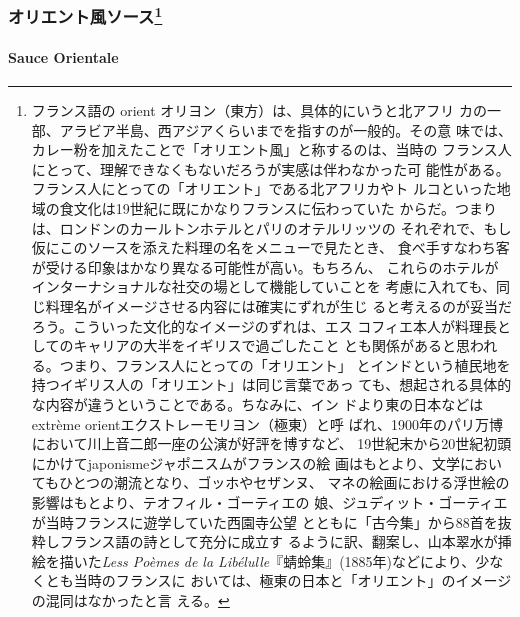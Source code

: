 \begin{recette}
{\subsubsection[オリエント風ソース]{\texorpdfstring{オリエント風ソース\footnote{フランス語の
  orient オリヨン（東方）は、具体的にいうと北アフリ
  カの一部、アラビア半島、西アジアくらいまでを指すのが一般的。その意
  味では、カレー粉を加えたことで「オリエント風」と称するのは、当時の
  フランス人にとって、理解できなくもないだろうが実感は伴わなかった可
  能性がある。フランス人にとっての「オリエント」である北アフリカやト
  ルコといった地域の食文化は19世紀に既にかなりフランスに伝わっていた
  からだ。つまりは、ロンドンのカールトンホテルとパリのオテルリッツの
  それぞれで、もし仮にこのソースを添えた料理の名をメニューで見たとき、
  食べ手すなわち客が受ける印象はかなり異なる可能性が高い。もちろん、
  これらのホテルがインターナショナルな社交の場として機能していことを
  考慮に入れても、同じ料理名がイメージさせる内容には確実にずれが生じ
  ると考えるのが妥当だろう。こういった文化的なイメージのずれは、エス
  コフィエ本人が料理長としてのキャリアの大半をイギリスで過ごしたこと
  とも関係があると思われる。つまり、フランス人にとっての「オリエント」
  とインドという植民地を持つイギリス人の「オリエント」は同じ言葉であっ
  ても、想起される具体的な内容が違うということである。ちなみに、イン
  ドより東の日本などはextrème orientエクストレーモリヨン（極東）と呼
  ばれ、1900年のパリ万博において川上音二郎一座の公演が好評を博すなど、
  19世紀末から20世紀初頭にかけてjaponismeジャポニスムがフランスの絵
  画はもとより、文学においてもひとつの潮流となり、ゴッホやセザンヌ、
  マネの絵画における浮世絵の影響はもとより、テオフィル・ゴーティエの
  娘、ジュディット・ゴーティエが当時フランスに遊学していた西園寺公望
  とともに「古今集」から88首を抜粋しフランス語の詩として充分に成立す
  るように訳、翻案し、山本翠水が挿絵を描いた\emph{Less Poèmes de la
  Libélulle}『蜻蛉集』(1885年)などにより、少なくとも当時のフランスに
  おいては、極東の日本と「オリエント」のイメージの混同はなかったと言
  える。}}{オリエント風ソース}}\label{ux30aaux30eaux30a8ux30f3ux30c8ux98a8ux30bdux30fcux30b9108}}

\hypertarget{sauce-orientale}{%
\paragraph{Sauce Orientale}\label{sauce-orientale}}



\end{recette}
